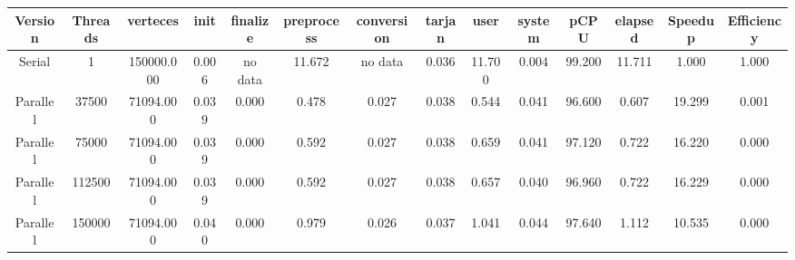 \begin{tabular}{|c|c|c|c|c|c|c|c|c|c|c|c|c|c|}
\toprule
 Version &  Threads &   verteces &  init & finalize &  preprocess & conversion &  tarjan &   user &  system &   pCPU &  elapsed &  Speedup &  Efficiency \\
\midrule
  Serial &        1 & 150000.000 & 0.006 &  no data &      11.672 &    no data &   0.036 & 11.700 &   0.004 & 99.200 &   11.711 &    1.000 &       1.000 \\
Parallel &    37500 &  71094.000 & 0.039 &    0.000 &       0.478 &      0.027 &   0.038 &  0.544 &   0.041 & 96.600 &    0.607 &   19.299 &       0.001 \\
Parallel &    75000 &  71094.000 & 0.039 &    0.000 &       0.592 &      0.027 &   0.038 &  0.659 &   0.041 & 97.120 &    0.722 &   16.220 &       0.000 \\
Parallel &   112500 &  71094.000 & 0.039 &    0.000 &       0.592 &      0.027 &   0.038 &  0.657 &   0.040 & 96.960 &    0.722 &   16.229 &       0.000 \\
Parallel &   150000 &  71094.000 & 0.040 &    0.000 &       0.979 &      0.026 &   0.037 &  1.041 &   0.044 & 97.640 &    1.112 &   10.535 &       0.000 \\
\bottomrule
\end{tabular}
